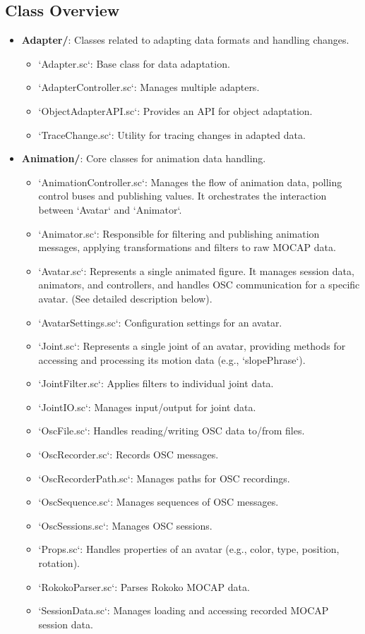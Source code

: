 \documentclass[11pt]{article}
\begin{document}
\subsection{Class Overview}
\label{sec:org8cafc9c}

\begin{itemize}
\item \textbf{Adapter/}: Classes related to adapting data formats and handling changes.
\begin{itemize}
\item `Adapter.sc`: Base class for data adaptation.
\item `AdapterController.sc`: Manages multiple adapters.
\item `ObjectAdapterAPI.sc`: Provides an API for object adaptation.
\item `TraceChange.sc`: Utility for tracing changes in adapted data.
\end{itemize}

\item \textbf{Animation/}: Core classes for animation data handling.
\begin{itemize}
\item `AnimationController.sc`: Manages the flow of animation data, polling control buses and publishing values. It orchestrates the interaction between `Avatar` and `Animator`.
\item `Animator.sc`: Responsible for filtering and publishing animation messages, applying transformations and filters to raw MOCAP data.
\item `Avatar.sc`: Represents a single animated figure. It manages session data, animators, and controllers, and handles OSC communication for a specific avatar. (See detailed description below).
\item `AvatarSettings.sc`: Configuration settings for an avatar.
\item `Joint.sc`: Represents a single joint of an avatar, providing methods for accessing and processing its motion data (e.g., `slopePhrase`).
\item `JointFilter.sc`: Applies filters to individual joint data.
\item `JointIO.sc`: Manages input/output for joint data.
\item `OscFile.sc`: Handles reading/writing OSC data to/from files.
\item `OscRecorder.sc`: Records OSC messages.
\item `OscRecorderPath.sc`: Manages paths for OSC recordings.
\item `OscSequence.sc`: Manages sequences of OSC messages.
\item `OscSessions.sc`: Manages OSC sessions.
\item `Props.sc`: Handles properties of an avatar (e.g., color, type, position, rotation).
\item `RokokoParser.sc`: Parses Rokoko MOCAP data.
\item `SessionData.sc`: Manages loading and accessing recorded MOCAP session data.
\end{itemize}


\end{itemize}
\end{document}
